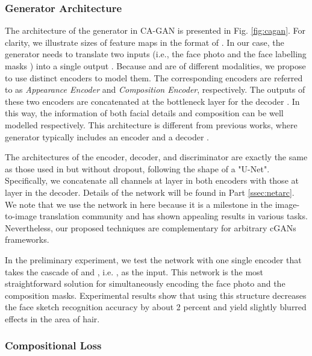 \documentclass[journal]{IEEEtran}
\begin{document}
\subsubsection{Generator Architecture}
\label{sec:garc}

The architecture of the generator in CA-GAN is presented in Fig. \ref{fig:cagan}. For clarity, we illustrate  sizes of feature maps in the format of . 
In our case, the generator needs to translate two inputs (i.e., the face photo  and the face labelling masks ) into a single output .
Because  and  are of different modalities, we propose to use distinct encoders to model them. The corresponding encoders are referred to as \textit{Appearance Encoder} and  \textit{Composition Encoder}, respectively.
The outputs of these two encoders are concatenated at the bottleneck layer for the decoder \cite{Yan2017Skeleton}. In this way, the information of both facial details and composition can be well modelled respectively.
This architecture is different from previous works, where generator typically includes an encoder and a decoder \cite{Isola2017Pix2Pix, Zhu2017CycleGAN, Zhang2017StackGAN}.


The architectures of the encoder, decoder, and discriminator are exactly the same as those used in \cite{Isola2017Pix2Pix} but without dropout, following the shape of a "U-Net". Specifically, we concatenate all channels at layer  in both encoders with those at layer  in the decoder. Details of the network will be found in Part \ref{ssec:netarc}. We note that we use the network in \cite{Isola2017Pix2Pix} here because it is a milestone in the image-to-image translation community and has shown appealing results in various tasks. Nevertheless, our proposed techniques are complementary for arbitrary cGANs frameworks. 

In the preliminary experiment, we test the network with one single encoder that takes the cascade of  and , i.e. , as the input.
This network is the most straightforward solution for simultaneously encoding the face photo and the composition masks. Experimental results show that using this structure decreases the face sketch recognition accuracy by about 2 percent and yield slightly blurred effects in the area of hair.



\subsubsection{Compositional Loss}
\label{sec:comploss}
\end{document}
